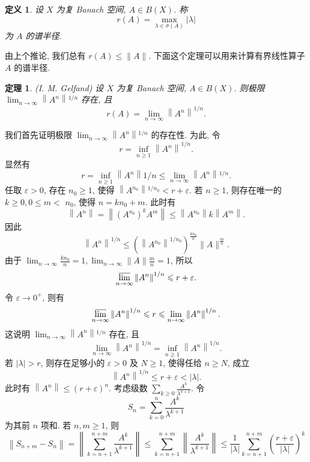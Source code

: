 \documentclass[openany]{ctexbook}
\makeatletter
\theoremstyle{kaiti}
\newtheorem{definition}{定义}[section]
\newtheorem{theorem}{定理}[section]
\theoremstyle{normal}
\renewenvironment{proof}[1][\proofname]{\par
    \pushQED{\qed}%
    \normalfont \topsep6\p@\@plus6\p@\relax
    \trivlist
    \item\relax
    {\heiti #1}\hspace{2\labelsep}\ignorespaces
  }{%
    \popQED\endtrivlist\@endpefalse
  }
\makeatother
\begin{document}
\begin{definition}
设 $X$ 为复 Banach 空间, $A \in B(X)$. 称
$$
r(A)=\max_{\lambda \in \sigma(A)}|\lambda|
$$
为 $A$ 的谱半径.
\end{definition}

由上个推论, 我们总有 $r(A) \leqslant\|A\|$. 下面这个定理可以用来计算有界线性算子 $A$ 的谱半径.

\begin{theorem}
(I. M. Gelfand) 设 $X$ 为复 Banach 空间, $A \in B(X)$. 则极限 $\lim_{n \rightarrow \infty}\left\|A^n\right\|{ }^{1 / n}$ 存在, 且
$$
r(A)=\lim_{n \rightarrow \infty}\left\|A^n\right\|^{1 / n}.
$$
\end{theorem}

\begin{proof}
我们首先证明极限 $\lim_{n \rightarrow \infty}\left\|A^n\right\|{ }^{1 / n}$ 的存在性. 为此, 令
$$
r=\inf_{n \geqslant 1}\left\|A^n\right\|^{1 / n}.
$$
显然有
$$
r=\inf_{n \geqslant 1}\left\|A^n\right\| 1 / n \leqslant \lim_{n \rightarrow \infty}\left\|A^n\right\|{ }^{1 / n}.
$$
任取 $\varepsilon>0$, 存在 $n_0 \geqslant 1$, 使得 $\left\|A^{n_0}\right\|{ }^{1 / n_0}<r+\varepsilon$. 若 $n \geqslant 1$, 则存在唯一的 $k \geqslant 0,0 \leqslant m<$ $n_0$, 使得 $n=k n_0+m$. 此时有
$$
\left\|A^n\right\|=\left\|\left(A^{n_0}\right)^{k} A^m\right\| \leqslant\left\|A^{n_0}\right\| k\left\|A^m\right\|.
$$
因此
$$
\left\|A^n\right\|^{1 / n} \leqslant\left(\left\|A^{n_0}\right\|^{1 / n_0}\right)^{\frac{k n_0}{n}}\|A\|^{\frac{m}{n}}.
$$
由于 $\lim_{n \rightarrow \infty} \frac{k n_0}{n}=1, \lim_{n \rightarrow \infty}\|A\| \frac{m}{n}=1$, 所以
$$
\varlimsup_{n \rightarrow \infty}\left\|A^n\right\|^{1 / n} \leqslant r+\varepsilon.
$$
令 $\varepsilon\to0^+$, 则有
$$
\varlimsup_{n \rightarrow \infty}\left\|A^n\right\|^{1 / n} \leqslant r \leqslant \lim_{n \rightarrow \infty}\left\|A^n\right\|^{1 / n}.
$$
这说明 $\lim_{n \rightarrow \infty}\left\|A^n\right\|{ }^{1 / n}$ 存在, 且
$$
\lim_{n \rightarrow \infty}\left\|A^n\right\|^{1 / n}=\inf_{n \geqslant 1}\left\|A^n\right\|^{1 / n}.
$$
若 $|\lambda|>r$, 则存在足够小的 $\varepsilon>0$ 及 $N \geqslant 1$, 使得任给 $n \geqslant N$, 成立
$$
\left\|A^n\right\|^{1 / n} \leqslant r+\varepsilon<|\lambda|.
$$
此时有 $\left\|A^n\right\| \leqslant(r+\varepsilon)^n$. 考虑级数 $\sum_{k \geqslant 0} \frac{A^{k}}{\lambda^{k+1}}$. 令
$$
S_n=\sum_{k=0}^n \frac{A^{k}}{\lambda^{k+1}}
$$
为其前 $n$ 项和. 若 $n, m \geqslant 1$, 则
$$
\left\|S_{n+m}-S_n\right\|=\left\|\sum_{k=n+1}^{n+m} \frac{A^{k}}{\lambda^{k+1}}\right\| \leqslant \sum_{k=n+1}^{n+m}\left\|\frac{A^{k}}{\lambda^{k+1}}\right\| \leqslant \frac{1}{|\lambda|} \sum_{k=n+1}^{n+m}\left(\frac{r+\varepsilon}{|\lambda|}\right)^{k}
$$
\end{proof}
\end{document}
